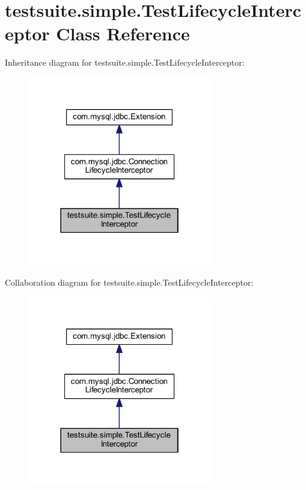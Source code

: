 \hypertarget{classtestsuite_1_1simple_1_1_test_lifecycle_interceptor}{}\section{testsuite.\+simple.\+Test\+Lifecycle\+Interceptor Class Reference}
\label{classtestsuite_1_1simple_1_1_test_lifecycle_interceptor}


Inheritance diagram for testsuite.\+simple.\+Test\+Lifecycle\+Interceptor\+:
\nopagebreak
\begin{figure}[H]
\begin{center}
\leavevmode
\includegraphics[width=226pt]{classtestsuite_1_1simple_1_1_test_lifecycle_interceptor__inherit__graph}
\end{center}
\end{figure}


Collaboration diagram for testsuite.\+simple.\+Test\+Lifecycle\+Interceptor\+:
\nopagebreak
\begin{figure}[H]
\begin{center}
\leavevmode
\includegraphics[width=226pt]{classtestsuite_1_1simple_1_1_test_lifecycle_interceptor__coll__graph}
\end{center}
\end{figure}

